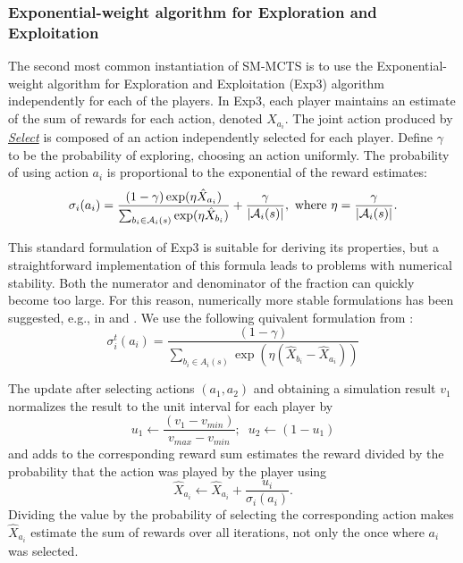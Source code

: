\subsubsection{Exponential-weight algorithm for Exploration and Exploitation}\label{sec:exp3}


The second most common instantiation of SM-MCTS is to use the Exponential-weight algorithm for Exploration and Exploitation (Exp3) algorithm \cite{Auer2003Exp3} independently for each of the players.
In Exp3, each player maintains an estimate of the sum of rewards for each action, denoted $\hat{X}_{a_i}$. The joint action produced by \emph{\underline{Select}} is composed of an action independently selected for each player.
Define $\gamma$ to be the probability of exploring, \ie choosing an action uniformly. 
The probability of using action $a_i$ is proportional to the exponential of the reward estimates:
\begin{equation}\label{eq:exp3select}
\sigma_i(a_i) = \frac{(1-\gamma) \exp(\eta \hat{X}_{a_i})}{\sum_{b_i \in \mathcal{A}_i(s)} \exp(\eta \hat{X}_{b_i})} + \frac{\gamma}{|\mathcal{A}_i(s)|},
  \mbox{ where } \eta = \frac{\gamma}{|\mathcal{A}_i(s)|}.
\end{equation}

This standard formulation of Exp3 is suitable for deriving its properties, but a straightforward implementation of this formula leads to problems with numerical stability. Both the numerator and denominator of the fraction can quickly become too large. For this reason, numerically more stable formulations has been suggested, e.g., in \cite{Lanctot13Goofspiel} and \cite{Cowling12ISMCTS}. We use the following quivalent formulation from \cite{Cowling12ISMCTS}:
\begin{equation}
\sigma^t_i(a_i) = \frac{(1-\gamma)}{\sum_{b_i \in A_i(s)}\exp(\eta(\hat{X}_{b_i}-\hat{X}_{a_i}))}
\end{equation}

The update after selecting actions $(a_1,a_2)$ and obtaining a simulation result $v_1$ normalizes the result to the unit interval for each player by
\begin{equation}
u_1 \leftarrow \frac{(v_1 - v_{min})}{v_{max} - v_{min}};\;\; u_2 \leftarrow (1-u_1)
\end{equation}
and adds to the corresponding reward sum estimates the reward divided by the probability that the action was played by the player using
\begin{equation}
\hat{X}_{a_i} \leftarrow \hat{X}_{a_i} + \frac{u_i}{\sigma_i(a_i)}.
\end{equation}
Dividing the value by the probability of selecting the corresponding action makes $\hat{X}_{a_i}$ estimate the sum of rewards over all
iterations, not only the once where $a_i$ was selected.

